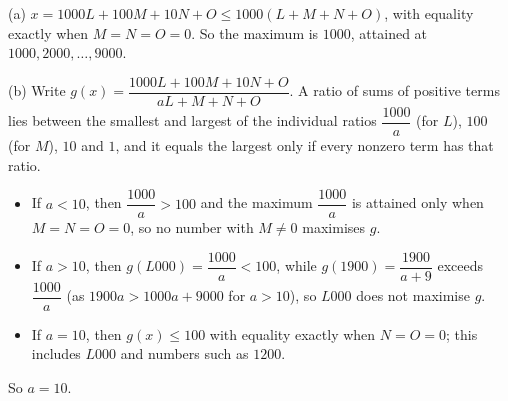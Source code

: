 (a) $x=1000L+100M+10N+O\le1000(L+M+N+O)$, with equality exactly when $M=N=O=0$. So the maximum is $\boxed{1000}$, attained at $1000,2000,\dots,9000$.

(b) Write $g(x)=\dfrac{1000L+100M+10N+O}{aL+M+N+O}$. A ratio of sums of positive terms lies between the smallest and largest of the individual ratios $\dfrac{1000}a$ (for $L$), $100$ (for $M$), $10$ and $1$, and it equals the largest only if every nonzero term has that ratio.
\begin{itemize}
\item If $a<10$, then $\dfrac{1000}a>100$ and the maximum $\dfrac{1000}a$ is attained only when $M=N=O=0$, so no number with $M\ne0$ maximises $g$.
\item If $a>10$, then $g(L000)=\dfrac{1000}a<100$, while $g(1900)=\dfrac{1900}{a+9}$ exceeds $\dfrac{1000}a$ (as $1900a>1000a+9000$ for $a>10$), so $L000$ does not maximise $g$.
\item If $a=10$, then $g(x)\le100$ with equality exactly when $N=O=0$; this includes $L000$ and numbers such as $1200$.
\end{itemize}
So $a=\boxed{10}$.
